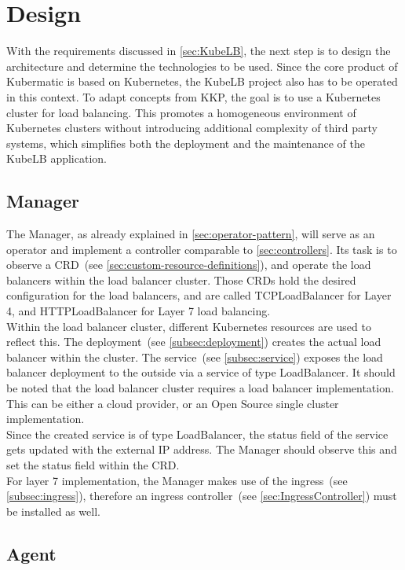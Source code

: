 \chapter{Design}

With the requirements discussed in \autoref{sec:KubeLB}, the next step is to design the architecture and determine the technologies to be used.
Since the core product of Kubermatic is based on Kubernetes, the KubeLB project also has to be operated in this context.
To adapt concepts from KKP, the goal is to use a Kubernetes cluster for load balancing.
This promotes a homogeneous environment of Kubernetes clusters without introducing additional complexity of third party systems, which simplifies both the deployment and the maintenance of the KubeLB application.

\section{Manager}\label{sec:manager}

The Manager, as already explained in \autoref{sec:operator-pattern}, will serve as an operator and implement a controller comparable to \autoref{sec:controllers}.
Its task is to observe a CRD~(see \autoref{sec:custom-resource-definitions}), and operate the load balancers within the load balancer cluster.
Those CRDs hold the desired configuration for the load balancers, and are called TCPLoadBalancer for Layer 4, and HTTPLoadBalancer for Layer 7 load balancing.
\\
Within the load balancer cluster, different Kubernetes resources are used to reflect this.
The deployment~(see \autoref{subsec:deployment}) creates the actual load balancer within the cluster.
The service~(see \autoref{subsec:service}) exposes the load balancer deployment to the outside via a service of type LoadBalancer.
It should be noted that the load balancer cluster requires a load balancer implementation.
This can be either a cloud provider, or an Open Source single cluster implementation.
\\
Since the created service is of type LoadBalancer, the status field of the service gets updated with the external IP address.
The Manager should observe this and set the status field within the CRD.
\\
For layer 7 implementation, the Manager makes use of the ingress~(see \autoref{subsec:ingress}), therefore an ingress controller~(see \autoref{sec:IngressController}) must be installed as well.

\section{Agent}\label{sec:agent}

